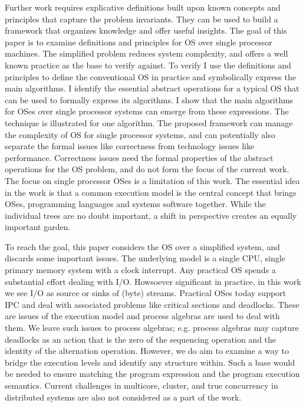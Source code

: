 \documentclass[draft]{article}
\begin{document}
Further  work  requires   explicative  definitions  built  upon  known
concepts and principles that capture the problem invariants.  They can
be used to build a framework that organizes knowledge and offer useful
insights.   The goal  of  this  paper is  to  examine definitions  and
principles  for OS  over  single processor  machines.  The  simplified
problem reduces system complexity, and offers a well known practice as
the  base to  verify against.   To verify  I use  the  definitions and
principles to define the  conventional OS in practice and symbolically
express  the  main  algorithms.   I identify  the  essential  abstract
operations for a  typical OS that can be used  to formally express its
algorithms.   I show  that the  main algorithms  for OSes  over single
processor systems can emerge from these expressions.  The technique is
illustrated for one algorithm.   The proposed framework can manage the
complexity  of OS for  single processor  systems, and  can potentially
also  separate  the formal  issues  like  correctness from  technology
issues   like  performance.   Correctness   issues  need   the  formal
properties of the  abstract operations for the OS  problem, and do not
form the  focus of  the current work.   The focus on  single processor
OSes is a limitation of this  work.  The essential idea in the work is
that a common execution model is the central concept that brings OSes,
programming  languages  and  systems  software  together.   While  the
individual  trees  are no  doubt  important,  a  shift in  perspective
creates an equally important garden.

To  reach the  goal, this  paper considers  the OS  over  a simplified
system, and discards some important issues.  The underlying model is a
single CPU, single primary memory  system with a clock interrupt.  Any
practical OS spends a  substantial effort dealing with I/O.  Howsoever
significant in practice, in this work we see I/O as source or sinks of
(byte)  streams.   Practical OSes  today  support  IPC  and deal  with
associated problems  like critical sections and  deadlocks.  These are
issues of  the execution model and  process algebras are  used to deal
with them.   We leave such  issues to process algebras;  e.g.  process
algebras may  capture deadlocks as an  action that is the  zero of the
sequencing operation  and the  identity of the  alternation operation.
However, we do aim to examine a way to bridge the execution levels and
identify any structure within.  Such  a base would be needed to ensure
matching the  program expression and the  program execution semantics.
Current  challenges in  multicore,  cluster, and  true concurrency  in
distributed systems are also not considered as a part of the work.
\end{document}
